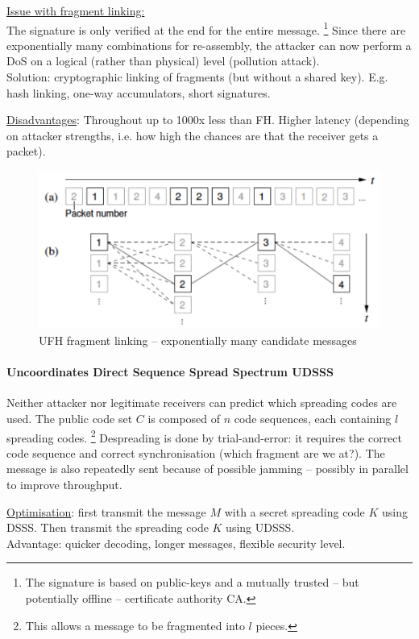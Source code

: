 \underline{Issue with fragment linking:} \\
The signature is only verified at the end for the entire message.%
\footnote{The signature is based on public-keys and a mutually trusted -- but potentially offline -- certificate authority CA.}
Since there are exponentially many combinations for re-assembly, the attacker can now perform a DoS on a logical (rather than physical) level (pollution attack).
\\
Solution: cryptographic linking of fragments (but without a shared key).
E.g. hash linking, one-way accumulators, short signatures.

\underline{Disadvantages}:
Throughout up to 1000x less than FH.
Higher latency (depending on attacker strengths, i.e. how high the chances are that the receiver gets a packet).

\begin{figure}
	\centering
	\includegraphics[scale=0.4]{images/3-ufh-fragment-linking.png}
	\caption{UFH fragment linking -- exponentially many candidate messages}
	\label{fig:ufh-fragment-linking}
\end{figure}

\paragraph{Uncoordinates Direct Sequence Spread Spectrum UDSSS}
Neither attacker nor legitimate receivers can predict which spreading codes are used.
The public code set $C$ is composed of $n$ code sequences, each containing $l$ spreading codes.%
\footnote{This allows a message to be fragmented into $l$ pieces.}
Despreading is done by trial-and-error: it requires the correct code sequence and correct synchronisation (which fragment are we at?).
The message is also repeatedly sent because of possible jamming -- possibly in parallel to improve throughput.

\underline{Optimisation}: first transmit the message $M$ with a secret spreading code $K$ using DSSS.
Then transmit the spreading code $K$ using UDSSS.
\\
Advantage: quicker decoding, longer messages, flexible security level.


